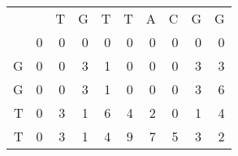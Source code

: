 \begin{enumerate}
	
	\begin{table}[H]
		\centering
		\begin{tabular}{rrrrrrrrrr}
			&                        & T                                              & G                                              & T                                              & T                                              & A                                               & C                                               & G                       & G                      \\ \cline{2-10} 
			\multicolumn{1}{r|}{}  & \multicolumn{1}{r|}{0} & \multicolumn{1}{r|}{0}                         & \multicolumn{1}{r|}{0}                         & \multicolumn{1}{r|}{0}                         & \multicolumn{1}{r|}{0}                         & \multicolumn{1}{r|}{0}                          & \multicolumn{1}{r|}{0}                          & \multicolumn{1}{r|}{0}  & \multicolumn{1}{r|}{0} \\ \cline{2-10} 
			\multicolumn{1}{r|}{G} & \multicolumn{1}{r|}{0} & \multicolumn{1}{r|}{\cellcolor[HTML]{FFCCC9}0} & \multicolumn{1}{r|}{3}                         & \multicolumn{1}{r|}{1}                         & \multicolumn{1}{r|}{0}                         & \multicolumn{1}{r|}{0}                          & \multicolumn{1}{r|}{0}                          & \multicolumn{1}{r|}{3}  & \multicolumn{1}{r|}{3} \\ \cline{2-10} 
			\multicolumn{1}{r|}{G} & \multicolumn{1}{r|}{0} & \multicolumn{1}{r|}{0}                         & \multicolumn{1}{r|}{\cellcolor[HTML]{DAE8FC}3} & \multicolumn{1}{r|}{1}                         & \multicolumn{1}{r|}{0}                         & \multicolumn{1}{r|}{0}                          & \multicolumn{1}{r|}{0}                          & \multicolumn{1}{r|}{3}  & \multicolumn{1}{r|}{6} \\ \cline{2-10} 
			\multicolumn{1}{r|}{T} & \multicolumn{1}{r|}{0} & \multicolumn{1}{r|}{3}                         & \multicolumn{1}{r|}{1}                         & \multicolumn{1}{r|}{\cellcolor[HTML]{DAE8FC}6} & \multicolumn{1}{r|}{4}                         & \multicolumn{1}{r|}{2}                          & \multicolumn{1}{r|}{0}                          & \multicolumn{1}{r|}{1}  & \multicolumn{1}{r|}{4} \\ \cline{2-10} 
			\multicolumn{1}{r|}{T} & \multicolumn{1}{r|}{0} & \multicolumn{1}{r|}{3}                         & \multicolumn{1}{r|}{1}                         & \multicolumn{1}{r|}{4}                         & \multicolumn{1}{r|}{\cellcolor[HTML]{DAE8FC}9} & \multicolumn{1}{r|}{7}                          & \multicolumn{1}{r|}{5}                          & \multicolumn{1}{r|}{3}  & \multicolumn{1}{r|}{2} \\ \cline{2-10} 

\end{tabular}
\end{table}
\end{enumerate}
